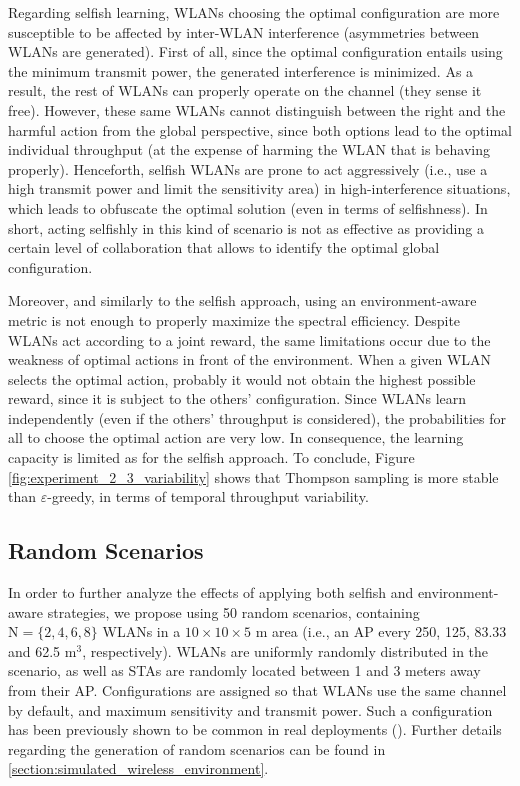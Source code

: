 \documentclass{article}
\begin{document}
Regarding selfish learning, WLANs choosing the optimal configuration are more susceptible to be affected by inter-WLAN interference (asymmetries between WLANs are generated). First of all, since the optimal configuration entails using the minimum transmit power, the generated interference is minimized. As a result, the rest of WLANs can properly operate on the channel (they sense it free). However, these same WLANs cannot distinguish between the right and the harmful action from the global perspective, since both options lead to the optimal individual throughput (at the expense of harming the WLAN that is behaving properly). Henceforth, selfish WLANs are prone to act aggressively (i.e., use a high transmit power and limit the sensitivity area) in high-interference situations, which leads to obfuscate the optimal solution (even in terms of selfishness). In short, acting selfishly in this kind of scenario is not as effective as providing a certain level of collaboration that allows to identify the optimal global configuration.

Moreover, and similarly to the selfish approach, using an environment-aware metric is not enough to properly maximize the spectral efficiency. Despite WLANs act according to a joint reward, the same limitations occur due to the weakness of optimal actions in front of the environment. When a given WLAN selects the optimal action, probably it would not obtain the highest possible reward, since it is subject to the others' configuration. Since WLANs learn independently (even if the others' throughput is considered), the probabilities for all to choose the optimal action are very low. In consequence, the learning capacity is limited as for the selfish approach. To conclude, Figure \ref{fig:experiment_2_3_variability} shows that Thompson sampling is more stable than $\varepsilon$-greedy, in terms of temporal throughput variability.

\subsection{Random Scenarios}
\label{section:scalability}	
In order to further analyze the effects of applying both selfish and environment-aware strategies, we propose using 50 random scenarios, containing $\text{N} = \{2, 4, 6, 8\}$ WLANs in a $10\times10\times5$ m area (i.e., an AP every 250, 125, 83.33 and 62.5 $\text{m}^3$, respectively). WLANs are uniformly randomly distributed in the scenario, as well as STAs are randomly located between 1 and 3 meters away from their AP. Configurations are assigned so that WLANs use the same channel by default, and maximum sensitivity and transmit power. Such a configuration has been previously shown to be common in real deployments (\citealp{akella2007self}). Further details regarding the generation of random scenarios can be found in \ref{section:simulated_wireless_environment}.
\end{document}
